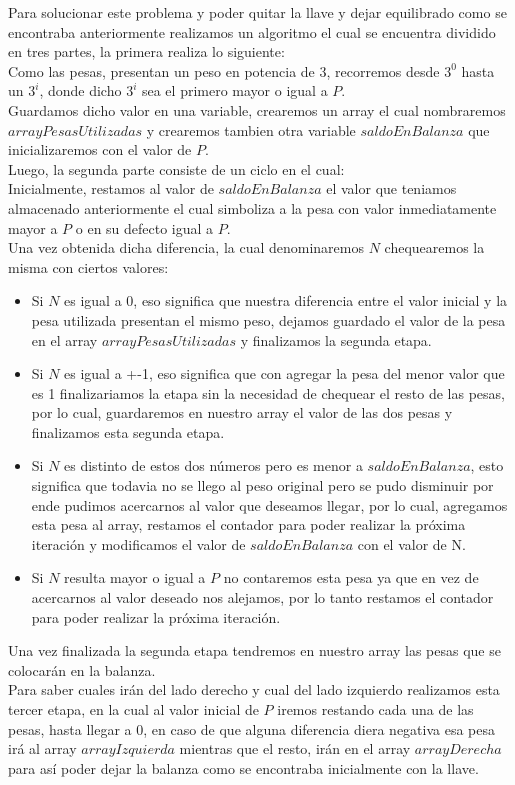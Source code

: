 
Para solucionar este problema y poder quitar la llave y dejar equilibrado como se encontraba anteriormente realizamos un algoritmo el cual se encuentra dividido en tres partes, la primera realiza lo siguiente:\\

Como las pesas, presentan un peso en potencia de 3, recorremos desde $3^0$ hasta un $3^i$, donde dicho $3^i$ sea el primero mayor o igual a $P$.\\
Guardamos dicho valor en una variable, crearemos un array el cual nombraremos $arrayPesasUtilizadas$ y crearemos tambien otra variable $saldoEnBalanza$ que inicializaremos con el valor de $P$.\\


Luego, la segunda parte consiste de un ciclo en el cual:\\

	Inicialmente, restamos al valor de $saldoEnBalanza$ el valor que teniamos almacenado anteriormente el cual simboliza a la pesa con valor inmediatamente mayor a $P$ o en su defecto igual a $P$.\\
	Una vez obtenida dicha diferencia, la cual denominaremos $N$ chequearemos la misma con ciertos valores:
	\begin{itemize}
	\item Si $N$ es igual a 0, eso significa que nuestra diferencia entre el valor inicial y la pesa utilizada presentan el mismo peso, dejamos guardado el valor de la pesa en el array $arrayPesasUtilizadas$ y finalizamos la segunda etapa.
	\item Si $N$ es igual a +-1, eso significa que con agregar la pesa del menor valor que es 1 finalizariamos la etapa sin la necesidad de chequear el resto de las pesas, por lo cual, guardaremos en nuestro array el valor de las dos pesas y finalizamos esta segunda etapa.
	\item Si $N$ es distinto de estos dos n\'umeros pero es menor a $saldoEnBalanza$, esto significa que todavia no se llego al peso original pero se pudo disminuir por ende pudimos acercarnos al valor que deseamos llegar, por lo cual, agregamos esta pesa al array, restamos el contador para poder realizar la pr\'oxima iteraci\'on y modificamos el valor de $saldoEnBalanza$ con el valor de N.
	\item Si $N$ resulta mayor o igual a $P$ no contaremos esta pesa ya que en vez de acercarnos al valor deseado nos alejamos, por lo tanto restamos el contador para poder realizar la pr\'oxima iteraci\'on.
	\end{itemize}


Una vez finalizada la segunda etapa tendremos en nuestro array las pesas que se colocar\'an en la balanza.\\
Para saber cuales ir\'an del lado derecho y cual del lado izquierdo realizamos esta tercer etapa, en la cual al valor inicial de $P$ iremos restando cada una de las pesas, hasta llegar a 0, en caso de que alguna diferencia diera negativa esa pesa ir\'a al array $arrayIzquierda$ mientras que el resto, ir\'an en el array $arrayDerecha$ para as\'i poder dejar la balanza como se encontraba inicialmente con la llave.

